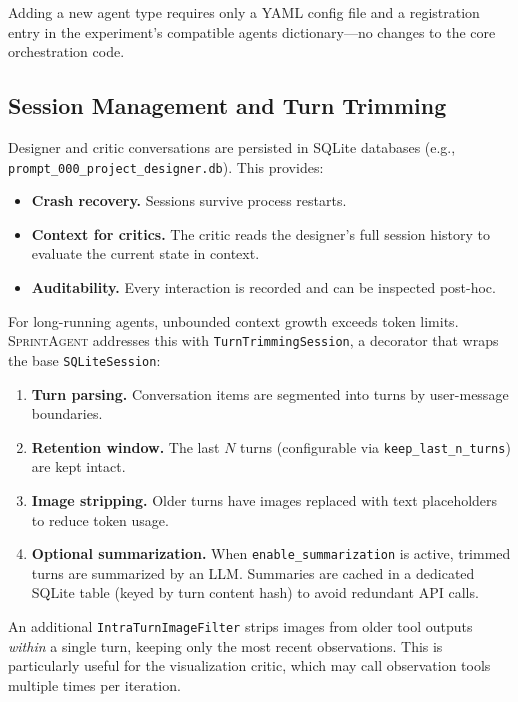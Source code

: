 \documentclass[11pt, a4paper]{article}
\newcommand{\sprintagent}{\textsc{SprintAgent}}
\begin{document}
Adding a new agent type requires only a YAML config file and a
registration entry in the experiment's compatible agents dictionary---no
changes to the core orchestration code.

\subsection{Session Management and Turn Trimming}
\label{sec:session}

Designer and critic conversations are persisted in SQLite databases
(e.g., \texttt{prompt\_000\_project\_designer.db}).  This provides:

\begin{itemize}[leftmargin=*]
  \item \textbf{Crash recovery.}  Sessions survive process restarts.
  \item \textbf{Context for critics.}  The critic reads the designer's
    full session history to evaluate the current state in context.
  \item \textbf{Auditability.}  Every interaction is recorded and can be
    inspected post-hoc.
\end{itemize}

For long-running agents, unbounded context growth exceeds token limits.
\sprintagent{} addresses this with \texttt{TurnTrimmingSession}, a
decorator that wraps the base \texttt{SQLiteSession}:

\begin{enumerate}[leftmargin=*]
  \item \textbf{Turn parsing.}  Conversation items are segmented into
    turns by user-message boundaries.
  \item \textbf{Retention window.}  The last $N$ turns (configurable via
    \texttt{keep\_last\_n\_turns}) are kept intact.
  \item \textbf{Image stripping.}  Older turns have images replaced with
    text placeholders to reduce token usage.
  \item \textbf{Optional summarization.}  When
    \texttt{enable\_summarization} is active, trimmed turns are
    summarized by an LLM.  Summaries are cached in a dedicated SQLite
    table (keyed by turn content hash) to avoid redundant API calls.
\end{enumerate}

An additional \texttt{IntraTurnImageFilter} strips images from older
tool outputs \emph{within} a single turn, keeping only the most recent
observations.  This is particularly useful for the visualization critic,
which may call observation tools multiple times per iteration.
\end{document}
